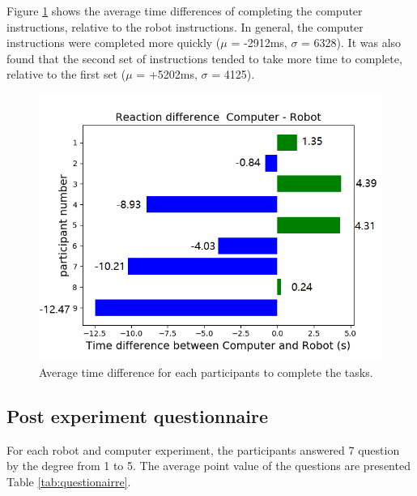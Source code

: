 \documentclass[conference]{IEEEtran}
\begin{document}
Figure \ref{fig:instruction_time_diff} shows the average time differences of completing the computer instructions, relative to the robot instructions. In general, the computer instructions were completed more quickly ($\mu$ = -2912ms, $\sigma$ = 6328). It was also found that the second set of instructions tended to take more time to complete, relative to the first set ($\mu$ = +5202ms, $\sigma$ = 4125).
\begin{figure}[h]
	\flushleft 
	\includegraphics[width=0.95\linewidth]{figures/difference.png}
	\caption{\label{fig:instruction_time_diff}Average time difference for each participants to complete the tasks.}  
\end{figure}

\subsection{Post experiment questionnaire}
For each robot and computer experiment, the participants answered 7 question by the degree from 1 to 5. The average point value of the questions are presented Table \ref{tab:questionairre}.   
\end{document}
